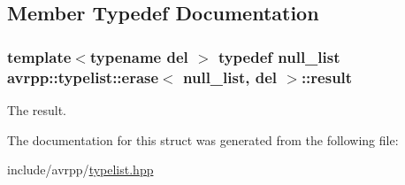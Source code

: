 \subsection{Member Typedef Documentation}
\hypertarget{structavrpp_1_1typelist_1_1erase_3_01null__list_00_01del_01_4_af131c5d4382f83489877aa5d51261d58}{
\subsubsection[{result}]{\setlength{\rightskip}{0pt plus 5cm}template$<$typename del $>$ typedef {\bf null\_\-list} {\bf avrpp::typelist::erase}$<$ {\bf null\_\-list}, del $>$::{\bf result}}}
\label{structavrpp_1_1typelist_1_1erase_3_01null__list_00_01del_01_4_af131c5d4382f83489877aa5d51261d58}


The result. 



The documentation for this struct was generated from the following file:\begin{DoxyCompactItemize}
\item 
include/avrpp/\hyperlink{typelist_8hpp}{typelist.hpp}\end{DoxyCompactItemize}
